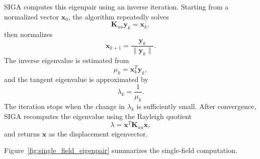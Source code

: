 \documentclass[11pt]{article}
\begin{document}
SIGA computes this eigenpair using an inverse iteration. Starting from a normalized vector \(\boldsymbol{x}_0\), the algorithm repeatedly solves
\[
    \mathbf{K}_{uu}\boldsymbol{y}_{k}
    =
    \boldsymbol{x}_{k},
\]
then normalizes
\[
    \boldsymbol{x}_{k+1}
    =
    \frac{\boldsymbol{y}_{k}}{\|\boldsymbol{y}_{k}\|}.
\]
The inverse eigenvalue is estimated from
\[
    \mu_k
    =
    \boldsymbol{x}_{k}^{T}\boldsymbol{y}_{k},
\]
and the tangent eigenvalue is approximated by
\[
    \lambda_k
    =
    \frac{1}{\mu_k}.
\]
The iteration stops when the change in \(\lambda_k\) is sufficiently small. After convergence, SIGA recomputes the eigenvalue using the Rayleigh quotient
\[
    \lambda
    =
    \boldsymbol{x}^{T}\mathbf{K}_{uu}\boldsymbol{x},
\]
and returns \(\boldsymbol{x}\) as the displacement eigenvector.

Figure~\ref{fig:single_field_eigenpair} summarizes the single-field computation.
\end{document}
